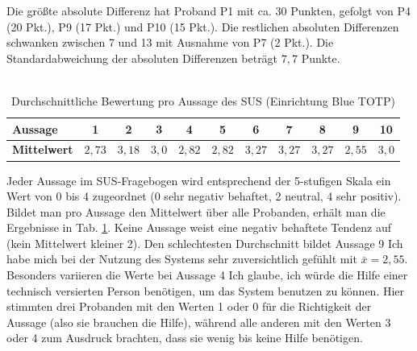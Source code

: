 Die größte absolute Differenz hat Proband P1 mit ca. 30 Punkten, gefolgt von P4 
(20 Pkt.), P9 (17 Pkt.) und P10 (15 Pkt.). Die restlichen absoluten Differenzen 
schwanken zwischen 7 und 13 mit Ausnahme von P7 (2 Pkt.). Die 
Standardabweichung der absoluten Differenzen beträgt $7{,}7$ Punkte.
\\\\
\begin{table}[b]
    \centering
    \begin{center}
    \begin{tabular}{| l | c | c | c | c | c | c | c | c | c | c |}
        \hline
        \textbf{Aussage} & 1 & 2 & 3 & 4 & 5 & 6 & 7 & 8 & 9 & 10 \\
        \hline
        \textbf{Mittelwert} & $2{,}73$ & $3{,}18$ & $3{,}0$ & $2{,}82$ & $2{,}82$ & $3{,}27$ & $3{,}27$ & $3{,}27$ & $2{,}55$ & $3{,}0$ \\  
        \hline
    \end{tabular}
    \end{center}
    \caption[Durchschnittliche Bewertung pro Aussage des SUS (Einrichtung Blue TOTP)]{Durchschnittliche Bewertung pro Aussage des SUS (Einrichtung Blue TOTP)}
    \label{tab: studie setup sus mean per question}
\end{table}
Jeder Aussage im SUS-Fragebogen wird entsprechend der 5-stufigen Skala ein Wert 
von 0 bis 4 zugeordnet (0 sehr negativ behaftet, 2 neutral, 4 sehr positiv). 
Bildet man pro Aussage den Mittelwert über alle Probanden, erhält man die 
Ergebnisse in Tab. \ref{tab: studie setup sus mean per question}. Keine Aussage weist eine negativ behaftete Tendenz auf 
(kein Mittelwert kleiner 2). Den schlechtesten Durchschnitt bildet Aussage 9 
\glqq Ich habe mich bei der Nutzung des Systems sehr zuversichtlich gefühlt\grqq{} mit 
$\bar{x} = 2{,}55$. 
Besonders variieren die Werte bei Aussage 4 \glqq Ich glaube, ich würde die Hilfe 
einer technisch versierten Person benötigen, um das System benutzen zu können\grqq{}. 
Hier stimmten drei Probanden mit den Werten 1 oder 0 für die Richtigkeit der 
Aussage (also sie brauchen die Hilfe), während alle anderen mit den Werten 3 
oder 4 zum Ausdruck brachten, dass sie wenig bis keine Hilfe benötigen.